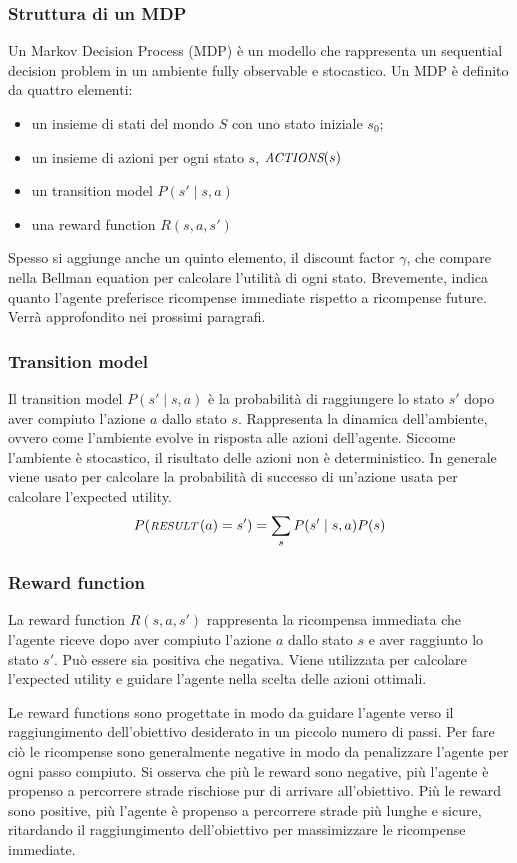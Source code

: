 \subsubsection*{Struttura di un MDP}
Un Markov Decision Process (MDP) è un modello che rappresenta un sequential decision problem in un ambiente fully observable
e stocastico. Un MDP è definito da quattro elementi:
\begin{itemize}
	\item un insieme di stati del mondo \(S\) con uno stato iniziale \(s_0\);
	\item un insieme di azioni per ogni stato \(s\), \(\textit{\small ACTIONS}(s)\)
	\item un transition model \(P(s' \mid s, a)\)
	\item una reward function \(R(s,a,s')\)
\end{itemize}
Spesso si aggiunge anche un quinto elemento, il discount factor \(\gamma\), che compare nella Bellman equation per calcolare
l'utilità di ogni stato. Brevemente, indica quanto l'agente preferisce ricompense immediate rispetto a ricompense future.
Verrà approfondito nei prossimi paragrafi.

\subsubsection*{Transition model}
Il transition model \(P(s' \mid s, a)\) è la probabilità di raggiungere lo stato \(s'\) dopo aver compiuto l'azione \(a\)
dallo stato \(s\). Rappresenta la dinamica dell'ambiente, ovvero come l'ambiente evolve in risposta alle azioni dell'agente.
Siccome l'ambiente è stocastico, il risultato delle azioni non è deterministico. In generale viene usato per calcolare
la probabilità di successo di un'azione usata per calcolare l'expected utility.
\[P(\textit{\footnotesize RESULT}\,(a) = s') =  \sum_s P(s' \mid s, a) P(s)\]

\subsubsection*{Reward function}
La reward function \(R(s,a,s')\) rappresenta la ricompensa immediata che l'agente riceve dopo aver compiuto l'azione \(a\)
dallo stato \(s\) e aver raggiunto lo stato \(s'\). Può essere sia positiva che negativa. Viene utilizzata per calcolare
l'expected utility e guidare l'agente nella scelta delle azioni ottimali.

Le reward functions sono progettate in modo da guidare l'agente verso il raggiungimento dell'obiettivo desiderato in un piccolo
numero di passi. Per fare ciò le ricompense sono generalmente negative in modo da penalizzare l'agente per ogni passo compiuto.
Si osserva che più le reward sono negative, più l'agente è propenso a percorrere strade rischiose pur di arrivare all'obiettivo.
Più le reward sono positive, più l'agente è propenso a percorrere strade più lunghe e sicure, ritardando il raggiungimento
dell'obiettivo per massimizzare le ricompense immediate.

